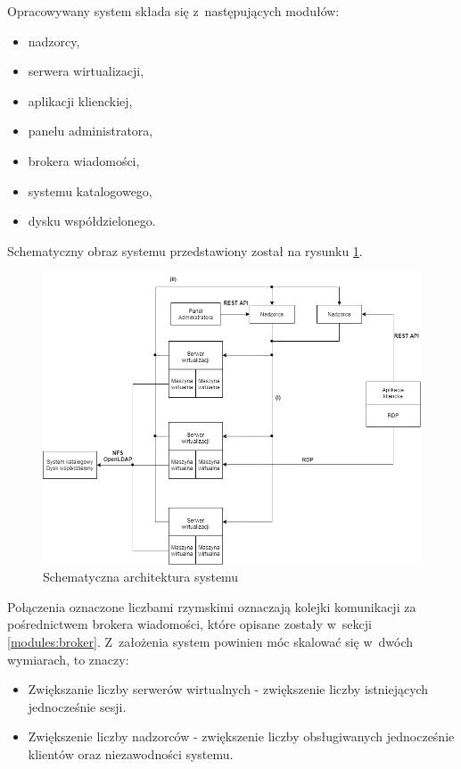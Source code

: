 \documentclass[../opis-rozwiazania.tex]{subfiles}
\begin{document}
Opracowywany system składa się z~następujących modułów:

\begin{itemize}
  \item nadzorcy,
  \item serwera wirtualizacji,
  \item aplikacji klienckiej,
  \item panelu administratora,
  \item brokera wiadomości,
  \item systemu katalogowego,
  \item dysku współdzielonego.
\end{itemize}

Schematyczny obraz systemu przedstawiony został na rysunku \ref{figure:architecture:system}.

\begin{figure}[ht]
  \centering
  \includegraphics[width=\textwidth]{../diagrams/architecture.png}
  \caption{Schematyczna architektura systemu}
  \label{figure:architecture:system}
\end{figure}

Połączenia oznaczone liczbami rzymskimi oznaczają kolejki komunikacji za pośrednictwem brokera wiadomości, które opisane zostały w~sekcji \ref{modules:broker}. Z~założenia system powinien móc skalować się w~dwóch wymiarach, to znaczy:
\begin{itemize}
  \item Zwiększanie liczby serwerów wirtualnych - zwiększenie liczby istniejących jednocześnie sesji.
  \item Zwiększenie liczby nadzorców - zwiększenie liczby obsługiwanych jednocześnie klientów oraz niezawodności systemu.
\end{itemize}
\end{document}
